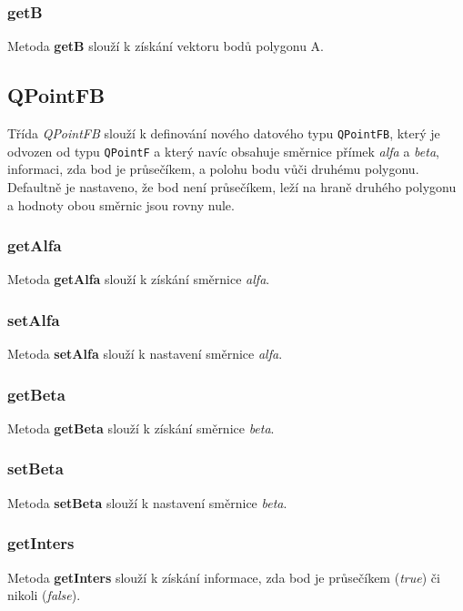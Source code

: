 \documentclass[a4paper, 12pt]{article}
\begin{document}
\subsubsection*{getB}
Metoda \textbf{getB} slouží k získání vektoru bodů polygonu A.



\subsection{QPointFB}
Třída \textit{QPointFB} slouží k definování nového datového typu \texttt{QPointFB}, který je odvozen od typu \texttt{QPointF} a který navíc obsahuje směrnice přímek \textsl{alfa} a \textsl{beta}, informaci, zda bod je průsečíkem, a polohu bodu vůči druhému polygonu. Defaultně je nastaveno, že bod není průsečíkem, leží na hraně druhého polygonu a hodnoty obou směrnic jsou rovny nule.

\subsubsection*{getAlfa}
Metoda \textbf{getAlfa} slouží k získání směrnice \textsl{alfa}.

\subsubsection*{setAlfa}
Metoda \textbf{setAlfa} slouží k nastavení směrnice \textsl{alfa}. 

\subsubsection*{getBeta}
Metoda \textbf{getBeta} slouží k získání směrnice \textsl{beta}.

\subsubsection*{setBeta}
Metoda \textbf{setBeta} slouží k nastavení směrnice \textsl{beta}. 

\subsubsection*{getInters}
Metoda \textbf{getInters} slouží k získání informace, zda bod je průsečíkem (\textit{true}) či nikoli (\textit{false}).
\end{document}
